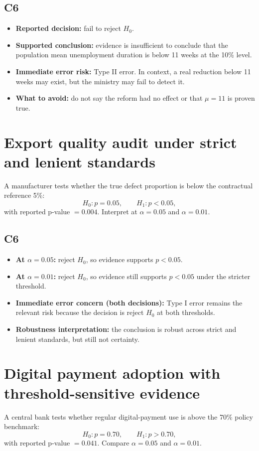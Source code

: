 \begin{ExamProblems}
\subsection*{C6}
\begin{itemize}
    \item \textbf{Reported decision:} fail to reject \(H_0\).
    \item \textbf{Supported conclusion:} evidence is insufficient to conclude that the population mean unemployment duration is below 11 weeks at the 10\% level.
    \item \textbf{Immediate error risk:} Type II error. In context, a real reduction below 11 weeks may exist, but the ministry may fail to detect it.
    \item \textbf{What to avoid:} do not say the reform had no effect or that \(\mu=11\) is proven true.
\end{itemize}

\item
\section{Export quality audit under strict and lenient standards}
A manufacturer tests whether the true defect proportion is below the contractual reference 5\%:
\[
H_0\colon p=0.05,\qquad H_1\colon p<0.05,
\]
with reported p-value \(=0.004\). Interpret at \(\alpha=0.05\) and \(\alpha=0.01\).

\subsection*{C6}
\begin{itemize}
    \item \textbf{At \(\alpha=0.05\):} reject \(H_0\), so evidence supports \(p<0.05\).
    \item \textbf{At \(\alpha=0.01\):} reject \(H_0\), so evidence still supports \(p<0.05\) under the stricter threshold.
    \item \textbf{Immediate error concern (both decisions):} Type I error remains the relevant risk because the decision is reject \(H_0\) at both thresholds.
    \item \textbf{Robustness interpretation:} the conclusion is robust across strict and lenient standards, but still not certainty.
\end{itemize}

\item
\section{Digital payment adoption with threshold-sensitive evidence}
A central bank tests whether regular digital-payment use is above the 70\% policy benchmark:
\[
H_0\colon p=0.70,\qquad H_1\colon p>0.70,
\]
with reported p-value \(=0.041\). Compare \(\alpha=0.05\) and \(\alpha=0.01\).


\end{ExamProblems}
